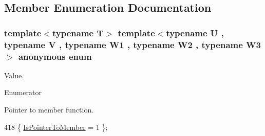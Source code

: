 \subsection{Member Enumeration Documentation}
\subsubsection[{\texorpdfstring{anonymous enum}{anonymous enum}}]{\setlength{\rightskip}{0pt plus 5cm}template$<$typename T$>$ template$<$typename U , typename V , typename W1 , typename W2 , typename W3 $>$ anonymous enum}\hypertarget{structTypeTraits_1_1PtrToMemberTraits_3_01U_07V_1_1_5_08_07W1_00_01W2_00_01W3_08_01const_01_01_4_ad3b825b2f5f0118b1b56020327992314}{}\label{structTypeTraits_1_1PtrToMemberTraits_3_01U_07V_1_1_5_08_07W1_00_01W2_00_01W3_08_01const_01_01_4_ad3b825b2f5f0118b1b56020327992314}
Value. \begin{Desc}
\item[Enumerator]\par
\begin{description}
\item[{\em 
Is\+Pointer\+To\+Member\hypertarget{structTypeTraits_1_1PtrToMemberTraits_3_01U_07V_1_1_5_08_07W1_00_01W2_00_01W3_08_01const_01_01_4_ad3b825b2f5f0118b1b56020327992314a6762629d9ef8d2c35cd60351a1282ff3}{}\label{structTypeTraits_1_1PtrToMemberTraits_3_01U_07V_1_1_5_08_07W1_00_01W2_00_01W3_08_01const_01_01_4_ad3b825b2f5f0118b1b56020327992314a6762629d9ef8d2c35cd60351a1282ff3}
}]Pointer to member function. \end{description}
\end{Desc}

\begin{DoxyCode}
418 \{ \hyperlink{structTypeTraits_1_1PtrToMemberTraits_3_01U_07V_1_1_5_08_07W1_00_01W2_00_01W3_08_01const_01_01_4_ad3b825b2f5f0118b1b56020327992314a6762629d9ef8d2c35cd60351a1282ff3}{IsPointerToMember} = 1    \};
\end{DoxyCode}
